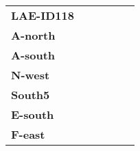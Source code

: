 \begin{tabular}{lrrrrl}
\textbf{LAE-ID118} &           &              &          &             &        \\
\textbf{A-north  } &           &              &          &             &        \\
\textbf{A-south  } &           &              &          &             &        \\
\textbf{N-west   } &           &              &          &             &        \\
\textbf{South5   } &           &              &          &             &        \\
\textbf{E-south  } &           &              &          &             &        \\
\textbf{F-east   } &           &              &          &             &        \\
\bottomrule
\end{tabular}
